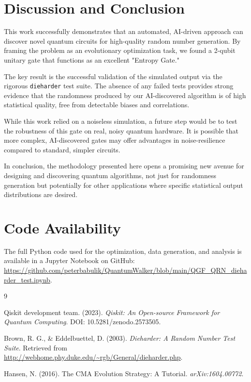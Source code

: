 \documentclass[11pt, a4paper]{article}
\begin{document}
\section{Discussion and Conclusion}
This work successfully demonstrates that an automated, AI-driven approach can discover novel quantum circuits for high-quality random number generation. By framing the problem as an evolutionary optimization task, we found a 2-qubit unitary gate that functions as an excellent "Entropy Gate."

The key result is the successful validation of the simulated output via the rigorous \texttt{dieharder} test suite. The absence of any failed tests provides strong evidence that the randomness produced by our AI-discovered algorithm is of high statistical quality, free from detectable biases and correlations.

While this work relied on a noiseless simulation, a future step would be to test the robustness of this gate on real, noisy quantum hardware. It is possible that more complex, AI-discovered gates may offer advantages in noise-resilience compared to standard, simpler circuits.

In conclusion, the methodology presented here opens a promising new avenue for designing and discovering quantum algorithms, not just for randomness generation but potentially for other applications where specific statistical output distributions are desired.

\section*{Code Availability}
The full Python code used for the optimization, data generation, and analysis is available in a Jupyter Notebook on GitHub: \url{https://github.com/peterbabulik/QuantumWalker/blob/main/QGF_QRN_dieharder_test.ipynb}.

\begin{thebibliography}{9}

Qiskit development team. (2023). \textit{Qiskit: An Open-source Framework for Quantum Computing}. DOI: 10.5281/zenodo.2573505.

Brown, R. G., \& Eddelbuettel, D. (2003). \textit{Dieharder: A Random Number Test Suite}. Retrieved from \url{http://webhome.phy.duke.edu/~rgb/General/dieharder.php}.

Hansen, N. (2016). The CMA Evolution Strategy: A Tutorial. \textit{arXiv:1604.00772}.

\end{thebibliography}
\end{document}
